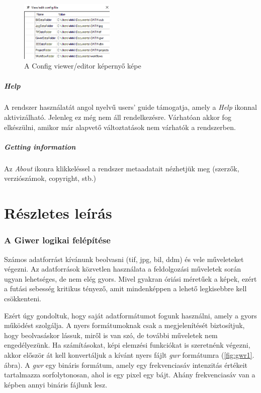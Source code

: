 \documentclass[a4paper,12pt]{article}
\begin{document}
\begin{figure}
\centering
\includegraphics[width=4.5cm]{config.png}
\caption{A Config viewer/editor képernyő képe}
\label{fig:config}
\end{figure}

\subsubsection{Help}

A rendszer használatát angol nyelvű users' guide támogatja, amely a \textit{Help} ikonnal aktivizálható. Jelenleg ez még nem áll rendelkezésre. Várhatóan akkor fog elkészülni, amikor már alapvető változtatások nem várhatók a rendszerben.


\subsubsection{Getting information}

Az \textit{About} ikonra klikkeléssel a rendszer metaadatait nézhetjük meg (szerzők, verziószámok, copyright, stb.)

\newpage
\part{Részletes leírás}

\setcounter{section}{0}

\section{A Giwer logikai felépítése}

Számos adatforrást kívánunk beolvasni (tif, jpg, bil, ddm) és vele műveleteket végezni. Az adatforrások közvetlen használata a feldolgozási műveletek során ugyan lehetséges, de nem elég gyors. Mivel gyakran óriási méretűek a képek, ezért a futási sebesség kritikus tényező, amit mindenképpen a lehető legkisebbre kell csökkenteni.

Ezért úgy gondoltuk, hogy saját adatformátumot fogunk használni, amely a gyors működést szolgálja. A nyers formátumoknak csak a megjelenítését biztosítjuk, hogy beolvasáskor lássuk, miről is van szó, de további műveletek nem engedélyezünk. Ha számításokat, képi elemzési funkciókat is szeretnénk végezni, akkor először át kell konvertáljuk a kívánt nyers fájlt \textit{gwr} formátumra (\ref{fig:gwr1}. ábra). A \textit{gwr} egy bináris formátum, amely egy frekvenciasáv intenzitás értékeit tartalmazza sorfolytonosan, ahol is egy pixel egy bájt. Ahány frekvenciasáv van a képben annyi bináris fájlunk lesz.
\end{document}
